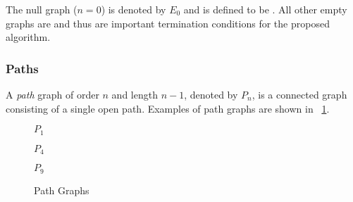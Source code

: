 The null graph (\(n=0\)) is denoted by \(E_0\) and is defined to be .  All other empty graphs are
 and thus are important termination conditions for the proposed algorithm.

\subsubsection{Paths}\label{sec:sub:sub:paths}

A \emph{path} graph of order \(n\) and length \(n-1\), denoted by \(P_n\), is a connected graph consisting of a
single open path.  Examples of path graphs are shown in \figurename~\ref{fig:path}.

\begin{figure}[H]
  \label{fig:path}
  \begin{minipage}{1.5in}
    \begin{center}

      \bigskip

      \(P_1\)
    \end{center}
  \end{minipage}
  \begin{minipage}{2.5in}
    \begin{center}

      \bigskip

      \(P_4\)
    \end{center}
  \end{minipage}
  \begin{minipage}{2in}
    \begin{center}

      \bigskip

      \(P_9\)
    \end{center}
  \end{minipage}
  \caption{Path Graphs}
\end{figure}

